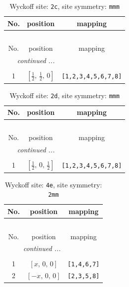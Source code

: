 \documentclass[fleqn,8pt]{jsarticle}
\begin{document}
\begin{longtable}{ccc}
\caption{Wyckoff site: {\tt 2c}, site symmetry: {\tt mmm}}
 \\
 \hline \hline
No. & position & mapping \\ \hline \endfirsthead

\multicolumn{2}{l}{\tablename\ \thetable{}} \\
 \hline \hline
No. & position & mapping \\ \hline \endhead

 \hline \hline
\multicolumn{2}{r}{\footnotesize\it continued ...} \\ \endfoot

 \hline \hline
\multicolumn{2}{r}{} \\ \endlastfoot

1 & $\left[ \frac{1}{2},\, \frac{1}{2},\, 0 \right]$ & {\tt [1,2,3,4,5,6,7,8]} \\
\end{longtable}
\renewcommand{\arraystretch}{1.2}
\begin{longtable}{ccc}
\caption{Wyckoff site: {\tt 2d}, site symmetry: {\tt mmm}}
 \\
 \hline \hline
No. & position & mapping \\ \hline \endfirsthead

\multicolumn{2}{l}{\tablename\ \thetable{}} \\
 \hline \hline
No. & position & mapping \\ \hline \endhead

 \hline \hline
\multicolumn{2}{r}{\footnotesize\it continued ...} \\ \endfoot

 \hline \hline
\multicolumn{2}{r}{} \\ \endlastfoot

1 & $\left[ \frac{1}{2},\, 0,\, \frac{1}{2} \right]$ & {\tt [1,2,3,4,5,6,7,8]} \\
\end{longtable}
\renewcommand{\arraystretch}{1.2}
\begin{longtable}{ccc}
\caption{Wyckoff site: {\tt 4e}, site symmetry: {\tt 2mm}}
 \\
 \hline \hline
No. & position & mapping \\ \hline \endfirsthead

\multicolumn{2}{l}{\tablename\ \thetable{}} \\
 \hline \hline
No. & position & mapping \\ \hline \endhead

 \hline \hline
\multicolumn{2}{r}{\footnotesize\it continued ...} \\ \endfoot

 \hline \hline
\multicolumn{2}{r}{} \\ \endlastfoot

1 & $\left[ x,\, 0,\, 0 \right]$ & {\tt [1,4,6,7]} \\ \hline
2 & $\left[ - x,\, 0,\, 0 \right]$ & {\tt [2,3,5,8]} \\
\end{longtable}
\end{document}
